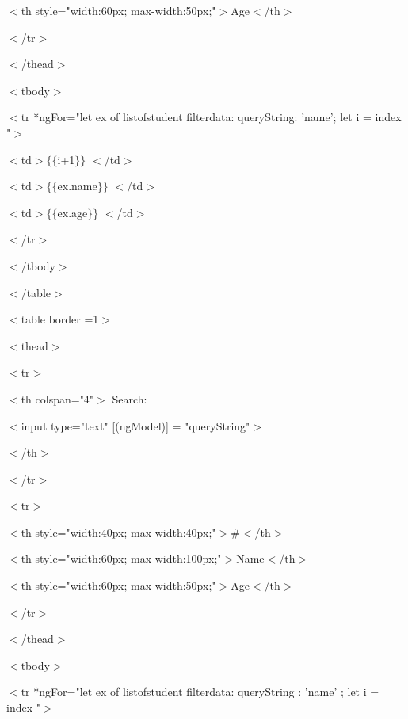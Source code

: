 \documentclass{article}
\begin{document}
$\mathrm{<}$th style="width:60px; max-width:50px;"$\mathrm{>}$Age$\mathrm{<}$/th$\mathrm{>}$

$\mathrm{<}$/tr$\mathrm{>}$

$\mathrm{<}$/thead$\mathrm{>}$

$\mathrm{<}$tbody$\mathrm{>}$

$\mathrm{<}$tr *ngFor="let ex of listofstudent{\textbar} filterdata: queryString: 'name'; let i = index "$\mathrm{>}$

$\mathrm{<}$td$\mathrm{>}$$\mathrm{\{}$$\mathrm{\{}$i+1$\mathrm{\}}$$\mathrm{\}}$ $\mathrm{<}$/td$\mathrm{>}$

$\mathrm{<}$td$\mathrm{>}$$\mathrm{\{}$$\mathrm{\{}$ex.name$\mathrm{\}}$$\mathrm{\}}$ $\mathrm{<}$/td$\mathrm{>}$

$\mathrm{<}$td$\mathrm{>}$$\mathrm{\{}$$\mathrm{\{}$ex.age$\mathrm{\}}$$\mathrm{\}}$ $\mathrm{<}$/td$\mathrm{>}$

$\mathrm{<}$/tr$\mathrm{>}$

$\mathrm{<}$/tbody$\mathrm{>}$

\noindent $\mathrm{<}$/table$\mathrm{>}$

\noindent $\mathrm{<}$table border =1$\mathrm{>}$

$\mathrm{<}$thead$\mathrm{>}$

$\mathrm{<}$tr$\mathrm{>}$

$\mathrm{<}$th colspan="4"$\mathrm{>}$ Search:

$\mathrm{<}$input type="text" [(ngModel)] = "queryString"$\mathrm{>}$

$\mathrm{<}$/th$\mathrm{>}$

  $\mathrm{<}$/tr$\mathrm{>}$

$\mathrm{<}$tr$\mathrm{>}$

$\mathrm{<}$th style="width:40px; max-width:40px;"$\mathrm{>}$\#$\mathrm{<}$/th$\mathrm{>}$

$\mathrm{<}$th style="width:60px; max-width:100px;"$\mathrm{>}$Name$\mathrm{<}$/th$\mathrm{>}$

\noindent $\mathrm{<}$th style="width:60px; max-width:50px;"$\mathrm{>}$Age$\mathrm{<}$/th$\mathrm{>}$

$\mathrm{<}$/tr$\mathrm{>}$

$\mathrm{<}$/thead$\mathrm{>}$

\noindent $\mathrm{<}$tbody$\mathrm{>}$

$\mathrm{<}$tr *ngFor="let ex of listofstudent{\textbar} filterdata: queryString : 'name' ; let i = index "$\mathrm{>}$
\end{document}
